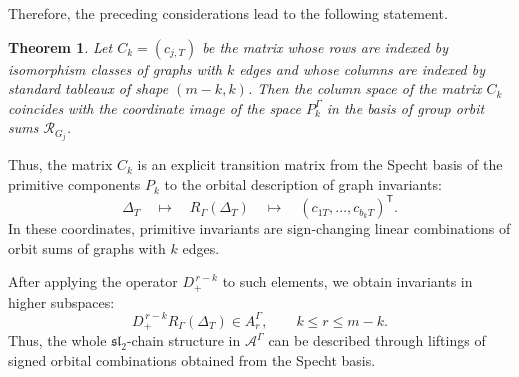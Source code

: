 \documentclass[12pt,reqno]{amsart}
\newtheorem{theorem}{Theorem}[section]
\begin{document}
Therefore, the preceding considerations lead to the following statement.

\begin{theorem}
Let $C_k=(c_{j,T})$ be the matrix whose rows are indexed by isomorphism
classes of graphs with $k$ edges and whose columns are indexed by standard
tableaux of shape $(m-k,k)$. Then the column space of the matrix $C_k$
coincides with the coordinate image of the space $P_k^\Gamma$ in the basis of
group orbit sums $\mathcal R_{G_j}$.
\end{theorem}


Thus, the matrix \(C_k\) is an explicit transition matrix from the Specht
basis of the primitive components \(P_k\) to the orbital description of graph
invariants:
$$
\Delta_T
\quad\longmapsto\quad
R_\Gamma(\Delta_T)
\quad\longmapsto\quad
(c_{1T},\dots,c_{b_kT})^{\mathsf T}.
$$
In these coordinates, primitive invariants are sign-changing linear
combinations of orbit sums of graphs with \(k\) edges.

After applying the operator \(D_+^{\,r-k}\) to such elements, we obtain
invariants in higher subspaces:
$$
D_+^{\,r-k}R_\Gamma(\Delta_T)
\in A_r^\Gamma,
\qquad k\le r\le m-k.
$$
Thus, the whole \(\mathfrak{sl}_2\)-chain structure in
\(\mathcal A^\Gamma\) can be described through liftings of signed orbital
combinations obtained from the Specht basis.
\end{document}
